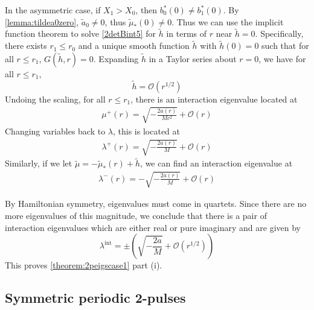\documentclass[thesis.tex]{subfiles}
\begin{document}
In the asymmetric case, if $X_1 > X_0$, then $b^*_0(0) \neq b^*_1(0)$. By \cref{lemma:tildea0zero}, $\tilde{a}_0 \neq 0$, thus $\tilde{\mu}_*(0) \neq 0$. Thus we can use the implicit function theorem to solve \cref{2detBint5} for $\tilde{h}$ in terms of $r$ near $\tilde{h} = 0$. Specifically, there exists $r_1 \leq r_0$ and a unique smooth function $\tilde{h}$ with $\tilde{h}(0) = 0$ such that for all $r \leq r_1$, $G(\tilde{h}, r) = 0$. Expanding $\tilde{h}$ in a Taylor series about $r = 0$, we have
for all $r \leq r_1$,
\[
\tilde{h} = \mathcal{O}( r^{1/2} )
\]
Undoing the scaling, for all $r \leq r_1$, there is an interaction eigenvalue located at
\begin{align*}
\mu^+(r) = \sqrt{-\frac{2 a(r)}{M c^2}} + \mathcal{O}(r)
\end{align*}
Changing variables back to $\lambda$, this is located at
\begin{align*}
\lambda^+(r) = \sqrt{-\frac{2 a(r)}{M}} + \mathcal{O}( r )
\end{align*}
Similarly, if we let $\tilde{\mu} = -\tilde{\mu}_*(r) + \tilde{h}$, we can find an interaction eigenvalue at
\begin{align*}
\lambda^-(r) = -\sqrt{-\frac{2 a(r)}{M}} + \mathcal{O}( r )
\end{align*}

By Hamiltonian symmetry, eigenvalues must come in quartets. Since there are no more eigenvalues of this magnitude, we conclude that there is a pair of interaction eigenvalues which are either real or pure imaginary and are given by
\[
\lambda^{\text{int}} = \pm \left( \sqrt{-\frac{2 a}{M}} + \mathcal{O}( r^{1/2} ) \right)
\]
This proves \cref{theorem:2peigscase1} part (i).

\subsection{Symmetric periodic 2-pulses}
\end{document}
